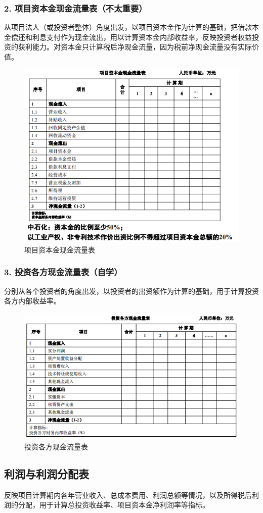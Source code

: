 \subsubsection{2. 项目资本金现金流量表（不太重要）}
从项目法人（或投资者整体）角度出发，以项目资本金作为计算的基础，把借款本金偿还和利息支付作为现金流出，用以计算资本金内部收益率，反映投资者权益投资的获利能力。对资本金只计算税后净现金流量，因为税前净现金流量没有实际价值。

\begin{figure}[H]
    \centering
    \includegraphics[width=0.6\linewidth]{image/项目资本金现金流量表.png}
    \caption{项目资本金现金流量表}
\end{figure}

\subsubsection{3. 投资各方现金流量表（自学）}
分别从各个投资者的角度出发，以投资者的出资额作为计算的基础，用于计算投资各方内部收益率。

\begin{figure}[H]
    \centering
    \includegraphics[width=0.6\linewidth]{image/投资各方现金流量表.png}
    \caption{投资各方现金流量表}
\end{figure}

\subsection{利润与利润分配表}
反映项目计算期内各年营业收入、总成本费用、利润总额等情况，以及所得税后利润的分配，用于计算总投资收益率、项目资本金净利润率等指标。

